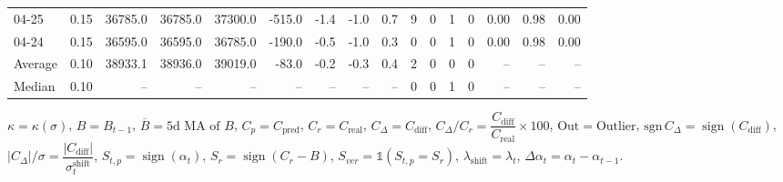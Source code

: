 \begin{threeparttable}
{\begin{tabular}{lrrrrrrrrrrrrrrr}
  04-25 &     0.15 & 36785.0 & 36785.0 & 37300.0 &     -515.0 &           -1.4 &                     -1.0 &                 0.7 &              9 &         0 &     1 &         0 &       0.00 &      0.98 &           0.00 \\
  04-24 &     0.15 & 36595.0 & 36595.0 & 36785.0 &     -190.0 &           -0.5 &                     -1.0 &                 0.3 &              0 &         0 &     1 &         0 &       0.00 &      0.98 &           0.00 \\
Average &     0.10 & 38933.1 & 38936.0 & 39019.0 &      -83.0 &           -0.2 &                     -0.3 &                 0.4 &              2 &         0 &     0 &         0 &         -- &        -- &             -- \\
 Median &     0.10 &      -- &      -- &      -- &         -- &             -- &                       -- &                  -- &              0 &         0 &     1 &         0 &         -- &        -- &             -- \\
\bottomrule
\end{tabular}
}
\begin{tablenotes}\footnotesize
\item $\kappa=\kappa(\sigma)$, $B=B_{t-1}$, $\overline{B}=\text{5d MA of }B$, $C_p=C_{\text{pred}}$, $C_r=C_{\text{real}}$, $C_\Delta=C_{\text{diff}}$, $C_\Delta/C_r=\dfrac{C_{\text{diff}}}{C_{\text{real}}}\times100$, $\mathrm{Out}=\text{Outlier}$, $\mathrm{sgn}\,C_\Delta=\operatorname{sign}(C_{\text{diff}})$, $|C_\Delta|/\sigma=\dfrac{|C_{\text{diff}}|}{\sigma_t^{\text{shift}}}$, $S_{t,p}=\operatorname{sign}(\alpha_t)$, $S_r=\operatorname{sign}(C_r - B)$, $S_{ver}=\mathbb{1}(S_{t,p}=S_r)$, $\lambda_{\text{shift}}=\lambda_t$, $\Delta\alpha_t=\alpha_t-\alpha_{t-1}$.\end{tablenotes}
\end{threeparttable}
\endgroup

